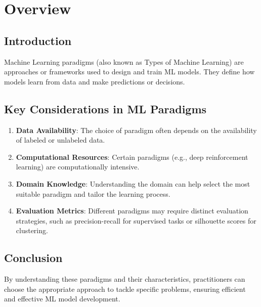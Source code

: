 \section{Overview}

\subsection*{Introduction}
Machine Learning paradigms (also known as Types of Machine Learning) are approaches or frameworks used to design and train ML models. They define how models learn from data and make predictions or decisions.

\subsection*{Key Considerations in ML Paradigms}
\begin{enumerate}
    \item \textbf{Data Availability}: The choice of paradigm often depends on the availability of labeled or unlabeled data.
    \item \textbf{Computational Resources}: Certain paradigms (e.g., deep reinforcement learning) are computationally intensive.
    \item \textbf{Domain Knowledge}: Understanding the domain can help select the most suitable paradigm and tailor the learning process.
    \item \textbf{Evaluation Metrics}: Different paradigms may require distinct evaluation strategies, such as precision-recall for supervised tasks or silhouette scores for clustering.
\end{enumerate}

\subsection*{Conclusion}
By understanding these paradigms and their characteristics, practitioners can choose the appropriate approach to tackle specific problems, ensuring efficient and effective ML model development.
